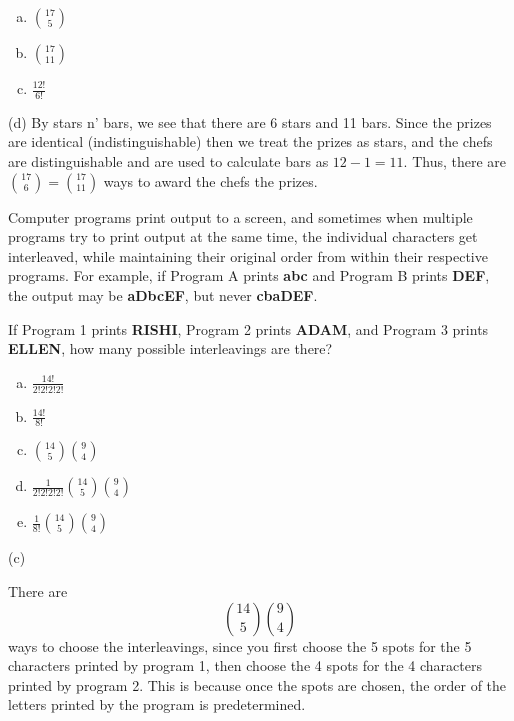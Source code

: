\begin{solution}
\begin{enumerate}[(a)]
	\item  $\binom{17}{5}$
    
	\item  $\binom{17}{11}$
    
	\item  $\frac{12!}{6!}$

\end{enumerate}
\begin{solution}

(d) By stars n' bars, we see that there are 6 stars and 11 bars. Since the prizes are identical (indistinguishable) then we treat the prizes as stars, and the chefs are distinguishable and are used to calculate bars as $12 - 1 = 11$. Thus, there are $\binom{17}{6} = \binom{17}{11}$ ways to award the chefs the prizes.

\end{solution}


Computer programs print output to a screen, and sometimes when multiple programs try to print output at the same time, the individual characters get interleaved, while maintaining their original order from within their respective programs. For example, if Program A prints \textbf{abc} and Program B prints \textbf{DEF}, the output may be \textbf{aDbcEF}, but never \textbf{cbaDEF}.

\vspace{0.1in}
If Program 1 prints \textbf{RISHI}, Program 2 prints \textbf{ADAM}, and Program 3 prints\\ \textbf{ELLEN}, how many possible interleavings are there?

\begin{enumerate}[(a)]
	\item  $\frac{14!}{2!2!2!2!}$
    
	\item  $\frac{14!}{8!}$
    
	\item  $\binom{14}{5} \binom{9}{4}$
    
	\item  $\frac{1}{2!2!2!2!} \binom{14}{5} \binom{9}{4}$
    
	\item  $\frac{1}{8!}\binom{14}{5} \binom{9}{4}$

\end{enumerate}
\begin{solution}
 
(c)

There are
\[
    \binom{14}{5} \binom{9}{4}
\]
ways to choose the interleavings, since you first choose the 5 spots for the 5 characters printed by program 1, then choose the 4 spots for the 4 characters printed by program 2. This is because once the spots are chosen, the order of the letters printed by the program is predetermined. 


\end{solution}
\end{solution}
